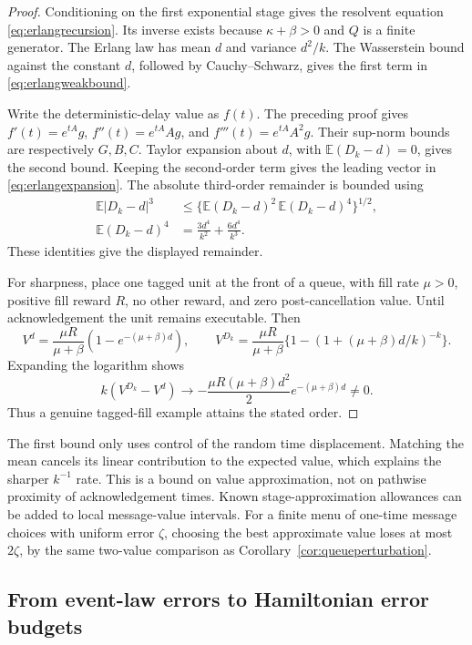\documentclass[11pt]{article}
\theoremstyle{plain}
\theoremstyle{definition}
\theoremstyle{remark}
\newcommand{\E}{\mathbb E}
\begin{document}
\begin{proof}
Conditioning on the first exponential stage gives the resolvent
equation \eqref{eq:erlangrecursion}. Its inverse exists because
\(\kappa+\beta>0\) and \(Q\) is a finite generator.
The Erlang law has mean \(d\) and variance \(d^2/k\).
The Wasserstein bound against the constant \(d\), followed by
Cauchy--Schwarz, gives the first term in \eqref{eq:erlangweakbound}.

Write the deterministic-delay value as \(f(t)\). The preceding
proof gives \(f'(t)=e^{tA}g\),
\(f''(t)=e^{tA}Ag\), and \(f'''(t)=e^{tA}A^2g\).
Their sup-norm bounds are respectively \(G,B,C\).
Taylor expansion about \(d\), with
\(\E(D_k-d)=0\), gives the second bound. Keeping the second-order
term gives the leading vector in \eqref{eq:erlangexpansion}.
The absolute third-order remainder is bounded using
\begin{align*}
 \E|D_k-d|^3
 &\le\{\E(D_k-d)^2\,\E(D_k-d)^4\}^{1/2},\\
 \E(D_k-d)^4&=\frac{3d^4}{k^2}+\frac{6d^4}{k^3}.
\end{align*}
These identities give the displayed remainder.

For sharpness, place one tagged unit at the front of a queue,
with fill rate \(\mu>0\), positive fill reward \(R\), no other
reward, and zero post-cancellation value. Until acknowledgement
the unit remains executable. Then
\[
 V^d=\frac{\mu R}{\mu+\beta}(1-e^{-(\mu+\beta)d}),\qquad
 V^{D_k}=\frac{\mu R}{\mu+\beta}
       \{1-(1+(\mu+\beta)d/k)^{-k}\}.
\]
Expanding the logarithm shows
\[
 k(V^{D_k}-V^d)\longrightarrow
 -\frac{\mu R(\mu+\beta)d^2}{2}e^{-(\mu+\beta)d}\ne0.
\]
Thus a genuine tagged-fill example attains the stated order.
\end{proof}

The first bound only uses control of the random time displacement.
Matching the mean cancels its linear contribution to the expected
value, which explains the sharper \(k^{-1}\) rate. This is a bound
on value approximation, not on pathwise proximity of acknowledgement
times. Known stage-approximation allowances can be added to local
message-value intervals. For a finite menu of one-time message
choices with uniform error \(\zeta\), choosing the best approximate
value loses at most \(2\zeta\), by the same two-value comparison
as Corollary~\ref{cor:queueperturbation}.


\subsection{From event-law errors to Hamiltonian error budgets}
\end{document}
